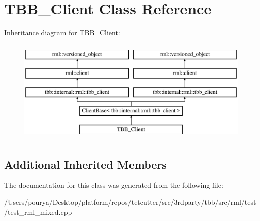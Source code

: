 \hypertarget{classTBB__Client}{}\section{T\+B\+B\+\_\+\+Client Class Reference}
\label{classTBB__Client}
Inheritance diagram for T\+B\+B\+\_\+\+Client\+:\begin{figure}[H]
\begin{center}
\leavevmode
\includegraphics[height=5.000000cm]{classTBB__Client}
\end{center}
\end{figure}
\subsection*{Additional Inherited Members}


The documentation for this class was generated from the following file\+:\begin{DoxyCompactItemize}
\item 
/\+Users/pourya/\+Desktop/platform/repos/tetcutter/src/3rdparty/tbb/src/rml/test/test\+\_\+rml\+\_\+mixed.\+cpp\end{DoxyCompactItemize}
